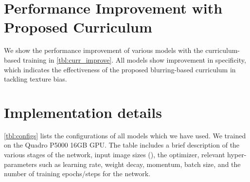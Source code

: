 \documentclass[10pt,twocolumn,letterpaper]{article}
\begin{document}
\section{Performance Improvement with Proposed Curriculum}
\label{supp:curr_improve}
We show the performance improvement of various models with the curriculum-based training in \cref{tbl:curr_improve}. All models show improvement in specificity, which indicates the effectiveness of the proposed blurring-based curriculum in tackling texture bias. 

\section{Implementation details}
\label{supp:impl}
\cref{tbl:configs} lists the configurations of all models which we have used. We trained on the Quadro P5000 16GB GPU. The table includes a brief description of the various stages of the network, input image sizes (), the optimizer, relevant hyper-parameters such as learning rate, weight decay, momentum, batch size, and the number of training epochs/steps for the network. 
\end{document}

